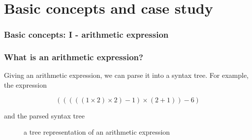 \documentclass[aspectratio=169]{beamer}
\begin{document}
\section{Basic concepts and case study}

\begin{frame}
    \frametitle{Basic concepts: I - arithmetic expression}
    \begin{figure}[ht]\centering
    \end{figure}
\end{frame}

\begin{frame}
\frametitle{What is an arithmetic expression?}

Giving an arithmetic expression, we can parse it into a syntax tree. For example, the expression

\begin{equation}
(((((1 \times 2) \times 2) - 1) \times (2 + 1)) - 6)\label{eq:equation}
\end{equation}

and the parsed syntax tree

\begin{figure}[ht]
\centering
{}
\caption{a tree representation of an arithmetic expression}\label{fig:syntaxtree}\label{fig:figure}
\end{figure}
\end{frame}
\end{document}
